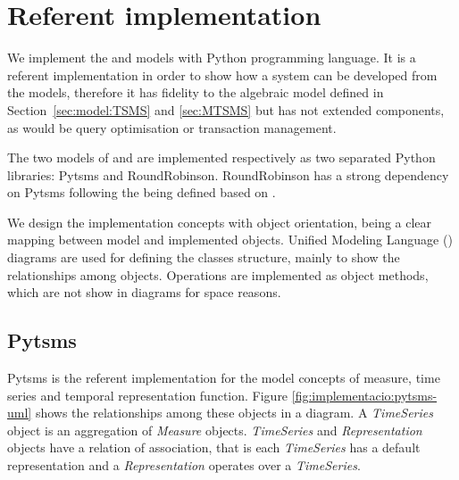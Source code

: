 

\section{Referent implementation}
\label{sec:implementation}

We implement the  and  models with Python
\cite{python:doc2} programming language. It is a referent
implementation in order to show how a system can be developed from the
models, therefore it has fidelity to the algebraic model defined in
Section~\ref{sec:model:TSMS} and \ref{sec:MTSMS} but has not extended
 components, as would be query optimisation or
transaction management.

The two models of  and  are implemented
respectively as two separated Python libraries: Pytsms and
RoundRobinson.  RoundRobinson has a strong dependency on Pytsms
following the  being defined based on .

We design the implementation concepts with object orientation, being a
clear mapping between model and implemented objects. Unified Modeling
Language () diagrams are used for defining the classes
structure, mainly to show the relationships among objects.  Operations
are implemented as object methods, which are not show in 
diagrams for space reasons.




\subsection{Pytsms}

Pytsms is the referent implementation for the model concepts of
measure, time series and temporal representation function.  Figure
\ref{fig:implementacio:pytsms-uml} shows the relationships among these
objects in a  diagram. A \emph{TimeSeries} object is an
aggregation of \emph{Measure} objects. \emph{TimeSeries} and
\emph{Representation} objects have a relation of association, that is
each \emph{TimeSeries} has a default representation and a
\emph{Representation} operates over a \emph{TimeSeries}.

